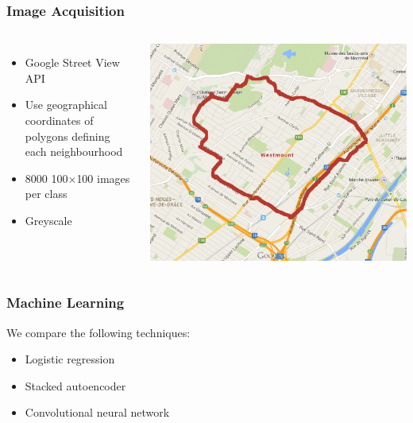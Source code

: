 \documentclass{beamer}
\begin{document}
\begin{frame}
\frametitle{Image Acquisition}
\begin{columns}[c] %

\begin{itemize}
\item Google Street View API
\item Use geographical coordinates of polygons defining each neighbourhood
\item 8000 100$\times$100 images per class
\item Greyscale
\end{itemize}
\includegraphics[width=0.9\linewidth]{polygon.png}
\end{columns}
\end{frame}

\begin{frame}
\frametitle{Machine Learning}
We compare the following techniques:
\begin{itemize}
\item Logistic regression
\item Stacked autoencoder 
\item Convolutional neural network
\end{itemize}
\end{frame}
\end{document}
